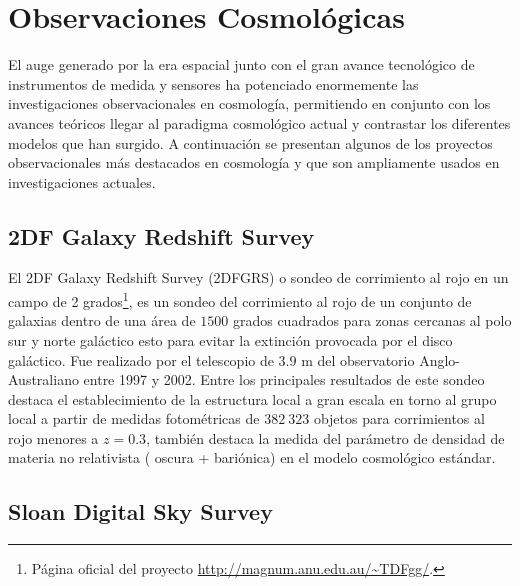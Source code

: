 \section{Observaciones Cosmológicas}
\label{sec:CosmologicalObservations}
	

El auge generado por la era espacial junto con el gran avance tecnológico
de ins\-trumentos de medida y sensores ha potenciado enormemente las 
investigaciones observacionales en cosmología, permitiendo en conjunto con 
los avances teóricos llegar al paradigma cosmológico actual y contrastar los 
diferentes modelos que han surgido. A continuación se presentan algunos de 
los proyectos observacionales más destacados en cosmología y que son 
ampliamente usados en investigaciones actuales.


	\subsection*{2DF Galaxy Redshift Survey}
	\label{subsec:2DFGRS}
	
	
El 2DF Galaxy Redshift Survey (2DFGRS) o sondeo de corrimiento al rojo en 
un campo de 2 grados\footnote{Página oficial del proyecto 
\url{http://magnum.anu.edu.au/~TDFgg/}.}, es un sondeo del corrimiento al 
rojo de un conjunto de galaxias dentro de una área de $1500$ grados cuadrados 
para zonas cercanas al polo sur y norte galáctico esto para evitar la extinción 
provocada por el disco galáctico. Fue realizado por el telescopio de $3.9$ m 
del observatorio Anglo-Australiano entre 1997 y 2002. Entre los principales 
resultados de este sondeo destaca el establecimiento de la estructura local 
a gran escala en torno al grupo local a partir de medidas fotométricas de 
$382\ 323$ objetos para corrimientos al rojo menores a $z=0.3$, también 
destaca la medida del parámetro de densidad de materia no relativista (
oscura + bariónica) en el modelo cosmológico estándar.

	
	\subsection*{Sloan Digital Sky Survey}
	\label{subsec:SDSS}


